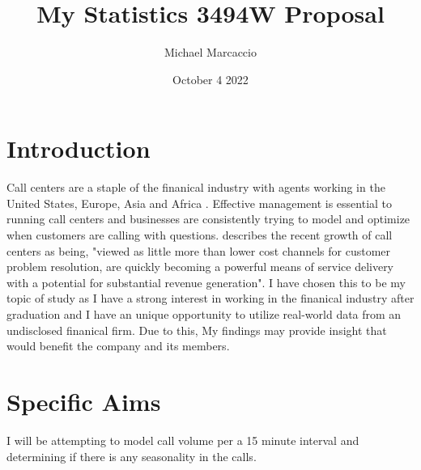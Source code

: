 \documentclass[12pt]{article}
\title{My Statistics 3494W Proposal}
\author{Michael  Marcaccio}
\date{October 4 2022}
\begin{document}
\maketitle

\section*{Introduction}
Call centers are a staple of the finanical industry with agents working in the United States, Europe, Asia and Africa \citep{ibrahim2016modeling}. 
Effective management is essential to running call centers and businesses are consistently trying to model and optimize when customers are calling with questions. 
\citet*{evensen1999effective} describes the recent growth of call centers as being, "viewed as little more than lower cost channels for customer
problem resolution, are quickly becoming a powerful means of service delivery with a potential for substantial revenue generation".
I have chosen this to be my topic of study as I have a strong interest in working in the finanical industry after graduation and I have an unique opportunity to utilize real-world data from an undisclosed
finanical firm. Due to this, My findings may provide insight that would benefit the company and its members.

\section*{Specific Aims}
I will be attempting to model call volume per a 15 minute interval and determining if there is any seasonality in the calls. 
    




\end{document}
